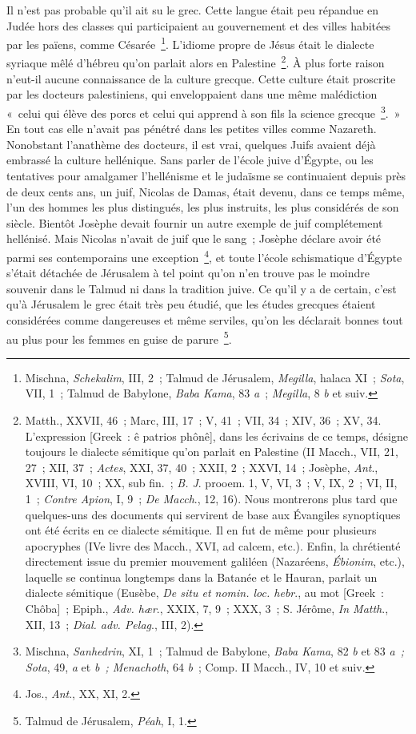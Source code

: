 \documentclass[french,twoside]{book} %
\begin{document}
Il n’est pas probable qu’il ait su le grec. Cette langue était peu répandue en Judée hors des classes qui participaient au gouvernement et des villes habitées par les païens, comme Césarée \footnote{ Mischna, {\itshape Schekalim}, III, 2 ; Talmud de Jérusalem, {\itshape Megilla}, halaca XI ; {\itshape Sota}, VII, 1 ; Talmud de Babylone, {\itshape Baba Kama}, 83 {\itshape a} ; {\itshape Megilla}, 8 {\itshape b} et suiv.}. L’idiome propre de Jésus était le dialecte syriaque mêlé d’hébreu qu’on parlait alors en Palestine \footnote{ Matth., XXVII, 46 ; Marc, III, 17 ; V, 41 ; VII, 34 ; XIV, 36 ; XV, 34. L’expression [Greek : ê patrios phônê], dans les écrivains de ce temps, désigne toujours le dialecte sémitique qu’on parlait en Palestine (II Macch., VII, 21, 27 ; XII, 37 ; {\itshape Actes}, XXI, 37, 40 ; XXII, 2 ; XXVI, 14 ; Josèphe, {\itshape Ant}., XVIII, VI, 10 ; XX, sub fin. ; {\itshape B. J}. prooem. 1, V, VI, 3 ; V, IX, 2 ; VI, II, 1 ; {\itshape Contre Apion}, I, 9 ; {\itshape De Macch}., 12, 16). Nous montrerons plus tard que quelques-uns des documents qui servirent de base aux Évangiles synoptiques ont été écrits en ce dialecte sémitique. Il en fut de même pour plusieurs apocryphes (IVe livre des Macch., XVI, ad calcem, etc.). Enfin, la chrétienté directement issue du premier mouvement galiléen (Nazaréens, {\itshape Ébionim}, etc.), laquelle se continua longtemps dans la Batanée et le Hauran, parlait un dialecte sémitique (Eusèbe, {\itshape De situ et nomin. loc. hebr}., au mot [Greek : Chôba] ; Epiph., {\itshape Adv. hær}., XXIX, 7, 9 ; XXX, 3 ; S. Jérôme, {\itshape In Matth}., XII, 13 ; {\itshape Dial. adv. Pelag}., III, 2).}. À plus forte raison n’eut-il aucune connaissance de la culture grecque. Cette culture était proscrite par les docteurs palestiniens, qui enveloppaient dans une même malédiction « celui qui élève des porcs et celui qui apprend à son fils la science grecque \footnote{ Mischna, {\itshape Sanhedrin}, XI, 1 ; Talmud de Babylone, {\itshape Baba Kama}, 82 {\itshape b} et 83 {\itshape a ; Sota}, 49, {\itshape a} et {\itshape b ; Menachoth}, 64 {\itshape b} ; Comp. II Macch., IV, 10 et suiv.}. » En tout cas elle n’avait pas pénétré dans les petites villes comme Nazareth. Nonobstant l’anathème des docteurs, il est vrai, quelques Juifs avaient déjà embrassé la culture hellénique. Sans parler de l’école juive d’Égypte, ou les tentatives pour amalgamer l’hellénisme et le judaïsme se continuaient depuis près de deux cents ans, un juif, Nicolas de Damas, était devenu, dans ce temps même, l’un des hommes les plus distingués, les plus instruits, les plus considérés de son siècle. Bientôt Josèphe devait fournir un autre exemple de juif complétement hellénisé. Mais Nicolas n’avait de juif que le sang ; Josèphe déclare avoir été parmi ses contemporains une exception \footnote{ Jos., {\itshape Ant}., XX, XI, 2.}, et toute l’école schismatique d’Égypte s’était détachée de Jérusalem à tel point qu’on n’en trouve pas le moindre souvenir dans le Talmud ni dans la tradition juive. Ce qu’il y a de certain, c’est qu’à Jérusalem le grec était très peu étudié, que les études grecques étaient considérées comme dangereuses et même serviles, qu’on les déclarait bonnes tout au plus pour les femmes en guise de parure \footnote{ Talmud de Jérusalem, {\itshape Péah}, I, 1.}. 
\end{document}
